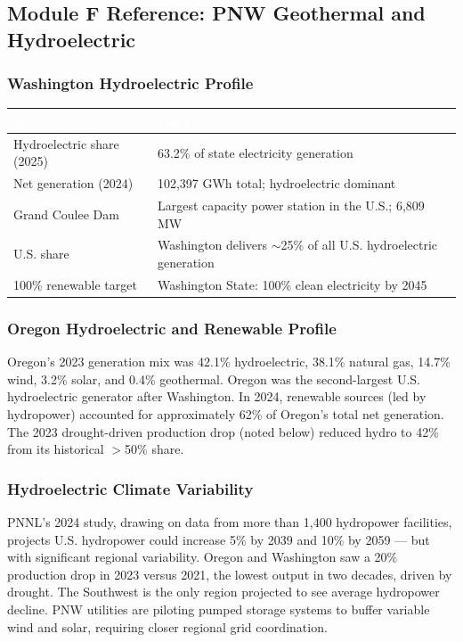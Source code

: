 \documentclass[11pt,letterpaper]{article}
\newcommand{\tableheader}[1]{\textbf{\sffamily\textcolor{white}{#1}}}
\begin{document}
\subsection{Module F Reference: PNW Geothermal and Hydroelectric}

\subsubsection{Washington Hydroelectric Profile}

\begin{center}
\begin{tabularx}{\textwidth}{L{4cm}X}
\toprule
{}
\tableheader{Metric} & \tableheader{Data} \\
\midrule
Hydroelectric share (2025) & 63.2\% of state electricity generation \\
Net generation (2024) & 102,397 GWh total; hydroelectric dominant \\
Grand Coulee Dam & Largest capacity power station in the U.S.; 6,809 MW \\
U.S. share & Washington delivers $\sim$25\% of all U.S. hydroelectric generation \\
100\% renewable target & Washington State: 100\% clean electricity by 2045 \\
\bottomrule
\end{tabularx}
\end{center}

\subsubsection{Oregon Hydroelectric and Renewable Profile}
Oregon's 2023 generation mix was 42.1\% hydroelectric, 38.1\% natural gas, 14.7\% wind, 3.2\% solar, and 0.4\% geothermal. Oregon was the second-largest U.S. hydroelectric generator after Washington. In 2024, renewable sources (led by hydropower) accounted for approximately 62\% of Oregon's total net generation. The 2023 drought-driven production drop (noted below) reduced hydro to 42\% from its historical $>$50\% share.

\subsubsection{Hydroelectric Climate Variability}
PNNL's 2024 study, drawing on data from more than 1,400 hydropower facilities, projects U.S. hydropower could increase 5\% by 2039 and 10\% by 2059 — but with significant regional variability. Oregon and Washington saw a 20\% production drop in 2023 versus 2021, the lowest output in two decades, driven by drought. The Southwest is the only region projected to see average hydropower decline. PNW utilities are piloting pumped storage systems to buffer variable wind and solar, requiring closer regional grid coordination.
\end{document}
